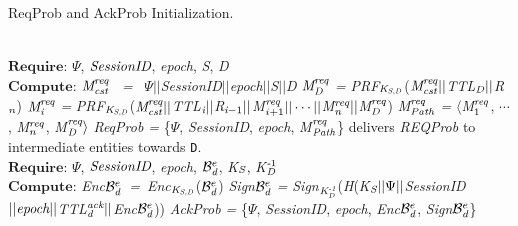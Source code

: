 \begin{algorithm}[t]
\footnotesize
\caption{ReqProb and AckProb Initialization.}
\label{reqpketinitialization}
\begin{algorithmic}[1]
 { }\\
    $\textbf{Require}$: $\Psi$, $\emph{SessionID}$, \emph{epoch}, \emph{S}, \emph{D}\\
    $\textbf{Compute}$:
    \State $\emph{M}_{\emph{cst}}^\emph{req}$ ~\emph{=}~ $\Psi\vert \vert$\emph{SessionID}$\vert \vert$\emph{epoch}$\vert \vert$\emph{S}$\vert \vert$\emph{D}
    \State $\emph{M}_\emph{D}^{\emph{req}}$ \emph{=} \emph{PRF}$_{\emph{K}_{\emph{S,D}}}$($\emph{M}_{\emph{cst}}^\emph{req}\vert \vert$\emph{TTL}$_\emph{D}\vert \vert$\emph{R}$_\emph{n}$)
    \State $\emph{M}_\emph{i}^{\emph{req}}$ \emph{=} \emph{PRF}$_{\emph{K}_{\emph{S,D}}}$($\emph{M}_{\emph{cst}}^\emph{req}\vert \vert$\emph{TTL}$_\emph{i}\vert \vert$\emph{R}$_{\emph{i}-1} \vert \vert$\emph{M}$_{{i}+1}^{\emph{req}} \vert \vert \cdots \vert \vert$\emph{M}$_\emph{n}^{\emph{req}}\vert \vert$\emph{M}$_\emph{D}^{\emph{req}}$)
    \EndFor
    \State \emph{M}$_\emph{Path}^\emph{req}$ \emph{ = } $\langle$\emph{M}$_1^\emph{req}$, $\cdots$, \emph{M}$_\emph{n}^\emph{req}$, \emph{M}$_\emph{D}^\emph{req}\rangle$
    \State \emph{ReqProb = }\{$\Psi$, \emph{SessionID}, \emph{epoch}, \emph{M}$_{\emph{Path}}^\emph{req}$\}
     delivers \emph{REQProb} to intermediate entities towards {\tt D}.
\EndFunction
{} { }\\
    $\textbf{Require}$: $\Psi$, $\emph{SessionID}$, \emph{epoch}, $\mathcal{B}_\emph{d}^e$, \emph{K}$_\emph{S}$, \emph{K}$_\emph{D}^{\emph{-}1}$ \\
    $\textbf{Compute}$:
    \State \emph{Enc}$\mathcal{B}_\emph{d}^e$~\emph{=}~\emph{Enc}$_{\emph{K}_{\emph{S,D}}}$($\mathcal{B}_\emph{d}^e$)
    \State \emph{Sign}$\mathcal{B}_\emph{d}^e$ \emph{=} \emph{Sign}$_{\emph{K}_\emph{D}^{\emph{-1}}}$(\emph{H}(\emph{K}$_\emph{S}\vert\vert\Psi\vert \vert$\emph{SessionID}$\vert\vert \emph{epoch} \vert \vert$\emph{TTL}$_{\emph{d}}^{\emph{ack}}\vert\vert$\emph{Enc}$\mathcal{B}_\emph{d}^e$))
    \State \emph{AckProb = }\{$\Psi$, \emph{SessionID}, \emph{epoch}, \emph{Enc}$\mathcal{B}_\emph{d}^e$, \emph{Sign}$\mathcal{B}_\emph{d}^e$\}\\

\end{algorithmic}
\end{algorithm}

